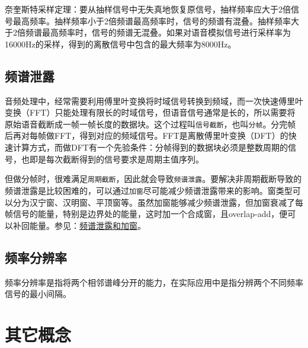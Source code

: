 \documentclass[cn,10pt,math=newtx,citestyle=gb7714-2015,bibstyle=gb7714-2015]{elegantbook}
\begin{document}
奈奎斯特采样定理：要从抽样信号中无失真地恢复原信号，抽样频率应大于2倍信号最高频率。抽样频率小于2倍频谱最高频率时，信号的频谱有混叠。抽样频率大于2倍频谱最高频率时，信号的频谱无混叠。如果对语音模拟信号进行采样率为16000Hz的采样，得到的离散信号中包含的最大频率为8000Hz。

\subsection{频谱泄露}

音频处理中，经常需要利用傅里叶变换将时域信号转换到频域，而一次快速傅里叶变换（FFT）只能处理有限长的时域信号，但语音信号通常是长的，所以需要将原始语音截断成一帧一帧长度的数据块。这个过程叫\lstinline{信号截断}，也叫\lstinline{分帧}。分完帧后再对每帧做FFT，得到对应的频域信号。FFT是离散傅里叶变换（DFT）的快速计算方式，而做DFT有一个先验条件：分帧得到的数据块必须是整数周期的信号，也即是每次截断得到的信号要求是周期主值序列。

但做分帧时，很难满足\lstinline{周期截断}，因此就会导致\lstinline{频谱泄露}。要解决非周期截断导致的频谱泄露是比较困难的，可以通过\lstinline{加窗}尽可能减少频谱泄露带来的影响。窗类型可以分为汉宁窗、汉明窗、平顶窗等。虽然加窗能够减少频谱泄露，但加窗衰减了每帧信号的能量，特别是边界处的能量，这时加一个合成窗，且overlap-add，便可以补回能量。参见：\href{https://zhuanlan.zhihu.com/p/339692933}{频谱泄露和加窗}。

\subsection{频率分辨率}
频率分辨率是指将两个相邻谱峰分开的能力，在实际应用中是指分辨两个不同频率信号的最小间隔。

\section{其它概念}
\end{document}
